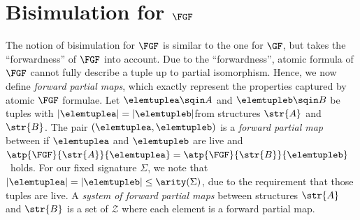 \section{Bisimulation for $\FGF$}
The notion of bisimulation for $\FGF$ is similar to the one for $\GF$, but takes the ``forwardness'' of $\FGF$ into account.
Due to the ``forwardness'', atomic formula of $\FGF$ cannot fully describe a tuple up to partial isomorphism.
Hence, we now define \emph{forward partial maps}, which exactly represent the properties captured by atomic $\FGF$ formulae.
Let $\elemtuplea \sqin A$ and $\elemtupleb \sqin B$ be tuples with $|\elemtuplea| = |\elemtupleb| $from structures $\str{A}$ and $\str{B}$.
The pair $(\elemtuplea, \elemtupleb)$ is a \emph{forward partial map} between if $\elemtuplea$ and $\elemtupleb$ are live and $\atp{\FGF}{\str{A}}{\elemtuplea} = \atp{\FGF}{\str{B}}{\elemtupleb}$~holds.
For our fixed signature $\Sigma$, we note that $|\elemtuplea| = |\elemtupleb| \le \arity(\Sigma)$, due to the requirement that those tuples are live.
A \emph{system of forward partial maps} between structures $\str{A}$ and $\str{B}$ is a set of $\mathcal{Z}$ where each element is a forward partial map.

